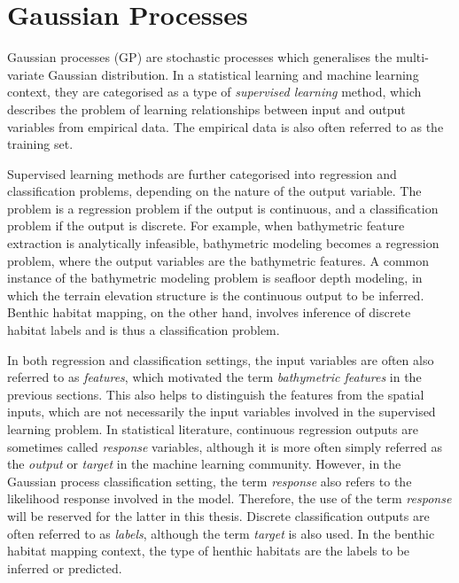 	\section{Gaussian Processes}
	\label{Background:GaussianProcesses}
	
		Gaussian processes (GP) are stochastic processes which generalises the multi-variate Gaussian distribution. In a statistical learning and machine learning context, they are categorised as a type of \textit{supervised learning} method, which describes the problem of learning relationships between input and output variables from empirical data. The empirical data is also often referred to as the training set.
		
		Supervised learning methods are further categorised into regression and classification problems, depending on the nature of the output variable. The problem is a regression problem if the output is continuous, and a classification problem if the output is discrete. For example, when bathymetric feature extraction is analytically infeasible, bathymetric modeling becomes a regression problem, where the output variables are the bathymetric features. A common instance of the bathymetric modeling problem is seafloor depth modeling, in which the terrain elevation structure is the continuous output to be inferred. Benthic habitat mapping, on the other hand, involves inference of discrete habitat labels and is thus a classification problem.
		
		In both regression and classification settings, the input variables are often also referred to as \textit{features}, which motivated the term \textit{bathymetric features} in the previous sections. This also helps to distinguish the features from the spatial inputs, which are not necessarily the input variables involved in the supervised learning problem. In statistical literature, continuous regression outputs are sometimes called \textit{response} variables, although it is more often simply referred as the \textit{output} or \textit{target} in the machine learning community. However, in the Gaussian process classification setting, the term \textit{response} also refers to the likelihood response involved in the model. Therefore, the use of the term \textit{response} will be reserved for the latter in this thesis. Discrete classification outputs are often referred to as \textit{labels}, although the term \textit{target} is also used. In the benthic habitat mapping context, the type of henthic habitats are the labels to be inferred or predicted. 
		
